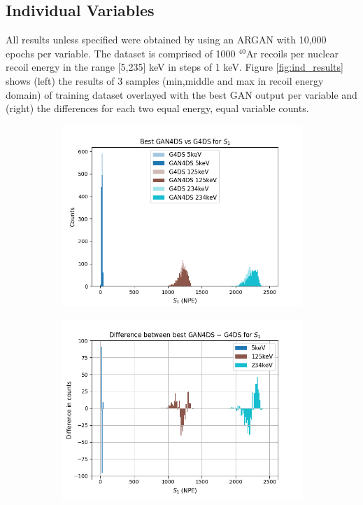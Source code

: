 \documentclass[11pt]{article} %
\begin{document}
\subsection{Individual Variables}
All results unless specified were obtained by using an ARGAN with 10,000 epochs per variable.
The dataset is comprised of 1000 $^{40}\mathrm{\text{Ar}}$ recoils per nuclear recoil energy in the range [5,235] keV in steps of 1 keV.
Figure \ref{fig:ind_results} shows (left) the results of 3 samples (min,middle and max in recoil energy domain) of training dataset overlayed with the best GAN output per variable and
(right) the differences for each two equal energy, equal variable counts.
\begin{figure}[H]
\centering
\begin{minipage}{\textwidth}
  \begin{subfigure}{.5\textwidth}
      \includegraphics[scale=0.5]{./images/best_s1.png}
  \end{subfigure}
  \begin{subfigure}{.5\textwidth}
      \includegraphics[scale=0.5]{./images/difference_best_s1.png}

\end{subfigure}
\end{minipage}
\end{figure}
\end{document}
